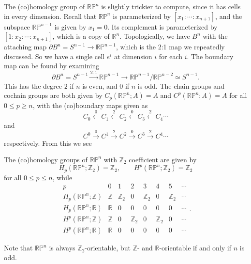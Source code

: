 \documentclass[12pt]{article}
\numberwithin{equation}{section}
\numberwithin{figure}{section}
\theoremstyle{remark}
\def\bR{\mathbb{R}}
\def\bZ{\mathbb{Z}}
\def\RP{\mathbb{RP}}
\begin{document}
The (co)homology group of $\RP^n$ is slightly trickier to compute,
since it has cells in every dimension.
Recall that $\RP^n$ is parameterized by $[x_1:\cdots:x_{n+1}]$,
and the subspace $\RP^{n-1}$ is given by $x_1=0$.
Its complement is parameterized by $[1:x_2:\cdots:x_{n+1}]$,
which is a copy of $\bR^n$.
Topologically, we have $B^n$ with the attaching map $\partial B^n=S^{n-1}\to \RP^{n-1}$, 
which is the 2:1 map we repeatedly discussed.
So we have a single cell $e^i$ at dimension $i$ for each $i$.
The boundary map can be found by examining \begin{equation}
\partial B^n = S^{n-1} \xrightarrow{2:1} \RP^{n-1} \to \RP^{n-1}/\RP^{n-2} \simeq S^{n-1}.
\end{equation}
This has the degree $2$ if $n$ is even, and $0$ if $n$ is odd.
The chain groups and cochain groups are both given by $C_p(\RP^n;A)=A$ 
and $C^p(\RP^n;A)=A$ for all $0\le p\ge n$, with the (co)boundary maps given as 
\begin{equation}
C_0 \xleftarrow{0} C_1 \xleftarrow{2} C_2 \xleftarrow{0} C_3 \xleftarrow{2} C_4 \cdots
\end{equation}
and 
\begin{equation}
C^0 \xrightarrow{0} C^1 \xrightarrow{2} C^2 \xrightarrow{0} C^3 \xrightarrow{2} C^4 \cdots
\end{equation}
respectively. 
From this we see 
\begin{example}
The (co)homology groups of $\RP^n$ with $\bZ_2$ coefficient are given by \begin{equation}
H_p(\RP^n;\bZ_2) = \bZ_2,\qquad
H^p(\RP^n;\bZ_2) = \bZ_2
\end{equation} for all $0\le p\le n$, while \begin{equation}
\begin{array}{c|ccccccccccccccccc}
  p& 0 &  1 & 2 & 3 & 4 & 5 & \cdots \\
  \hline
  H_p(\RP^n;\bZ) & \bZ & \bZ_2  & 0 & \bZ_2&  0 & \bZ_2 & \cdots \\
  H_p(\RP^n;\bR) & \bR & 0 & 0 & 0 & 0 & 0 & \cdots \\
  H^p(\RP^n;\bZ) & \bZ & 0 & \bZ_2  & 0 & \bZ_2&    0 & \cdots \\
  H^p(\RP^n;\bR) & \bR & 0 & 0 & 0 & 0 & 0 & \cdots 
\end{array} .
\end{equation}
\end{example}

Note that $\RP^n$ is always $\bZ_2$-orientable,
but $\bZ$- and $\bR$-orientable if and only if $n$ is odd.
\end{document}
